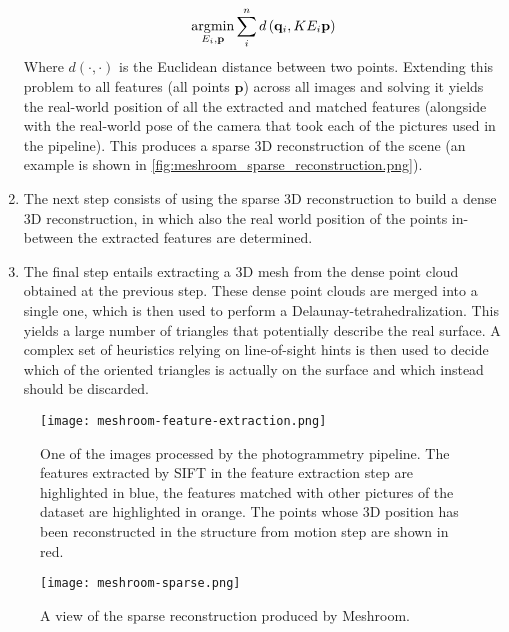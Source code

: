 \begin{enumerate}
    \begin{equation}
        \operatorname*{\arg\!\min}_{E_i, \mathbf{p}} \sum_i^n d\left(\mathbf{q}_i, KE_i\mathbf{p}\right)
    \end{equation}
    Where $d\left(\cdot, \cdot\right)$ is the Euclidean distance between two points. Extending this problem to all features (all points $\mathbf{p}$) across all images and solving it yields the real-world position of all the extracted and matched features (alongside with the real-world pose of the camera that took each of the pictures used in the pipeline). This produces a sparse 3D reconstruction of the scene (an example is shown in \autoref{fig:meshroom_sparse_reconstruction.png}).
    \item The next step consists of using the sparse 3D reconstruction to build a dense 3D reconstruction, in which also the real world position of the points in-between the extracted features are determined.
    \item The final step entails extracting a 3D mesh from the dense point cloud obtained at the previous step. These dense point clouds are merged into a single one, which is then used to perform a Delaunay-tetrahedralization. This yields a large number of triangles that potentially describe the real surface. A complex set of heuristics\cite{labatut_robust_2009,jancosek_multi-view_2011} relying on line-of-sight hints is then used to decide which of the oriented triangles is actually on the surface and which instead should be discarded.
\end{enumerate}

\begin{figure}
  \centering
  \texttt{[image: meshroom-feature-extraction.png]}
  \caption{One of the images processed by the photogrammetry pipeline. The features extracted by SIFT in the feature extraction step are highlighted in blue, the features matched with other pictures of the dataset are highlighted in orange. The points whose 3D position has been reconstructed in the structure from motion step are shown in red.}\label{fig:photogrammetry_feature_extraction_matching_reconstruction}
\end{figure}

\begin{figure}
  \centering
  \texttt{[image: meshroom-sparse.png]}
  \caption{A view of the sparse reconstruction produced by Meshroom.}\label{fig:meshroom_sparse_reconstruction.png}
\end{figure}

